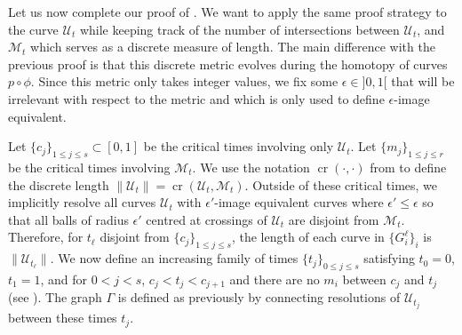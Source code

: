 \documentclass[10pt,a4paper]{amsart}
\newcommand{\cross}{\operatorname{cr}}
\begin{document}
Let us now complete our proof of . We want to apply the same proof strategy to the curve $\mathcal{U}_t$ while keeping track of the number of intersections between $\mathcal{U}_t$, and $\mathcal{M}_t$ which serves as a discrete measure of length. The main difference with the previous proof is that this discrete metric evolves during the homotopy of curves $p \circ \phi$. Since this metric only takes integer values, we fix some $\epsilon \in ]0,1[$ that will be irrelevant with respect to the metric and which is only used to define $\epsilon$-image equivalent. 


Let $\{ c_j \}_{1\leq j \leq s} \subset [0,1]$ be the critical times involving only $\mathcal{U}_t$. Let $\{ m_j \}_{1\leq j \leq r}$ be the critical times involving $\mathcal{M}_t$. We use the notation $\cross (\cdot, \cdot)$ from  to define the discrete length $ \| \mathcal{U}_t \| = \cross ( \mathcal{U}_t, \mathcal{M}_t )$. Outside of these critical times, we implicitly resolve all curves $\mathcal{U}_t$ with $\epsilon '$-image equivalent curves where $\epsilon ' \leq \epsilon$ so that all balls of radius $\epsilon '$ centred at crossings of $\mathcal{U}_t$ are disjoint from $\mathcal{M}_t$. Therefore, for $t_\ell$ disjoint from $\{ c_j \}_{1\leq j \leq s}$, the length of each curve in $\{ G^\ell_i\}_i$ is $\| \mathcal{U}_{t_\ell} \|$. We now define an increasing family of times $\{ t_j \}_{0 \leq j \leq s}$ satisfying $t_0 = 0$, $t_1 = 1$, and for $0 < j < s$, $ c_j < t_{j} < c_{j+1} $ and there are no $m_i$ between $c_j$ and $t_{j}$ (see ). The graph $\Gamma$ is defined as previously by connecting resolutions of $\mathcal{U}_{t_j}$ between these times $t_j$.
\end{document}

